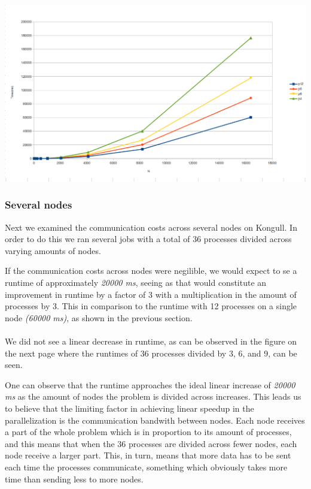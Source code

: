 \documentclass[fontsize=11pt,paper=a4,titlepage]{article}
\begin{document}
\includegraphics[scale=0.5]{pics/pX.png}

\subsubsection{Several nodes}
Next we examined the communication costs across several nodes on Kongull.
In order to do this we ran several jobs with a total of 36 processes divided across varying amounts of nodes.

If the communication costs across nodes were negilible, we would expect to se a runtime of approximately \emph{20000 ms}, seeing as that would constitute an improvement in runtime by a factor of 3 with a multiplication in the amount of processes by 3. This in comparison to the runtime with 12 processes on a single node \emph{(60000 ms)}, as shown in the previous section.
\\\\
We did not see a linear decrease in runtime, as can be observed in the figure on the next page where the runtimes of 36 processes divided by 3, 6, and 9, can be seen.

One can observe that the runtime approaches the ideal linear increase of \emph{20000 ms} as the amount of nodes the problem is divided across increases. This leads us to believe that the limiting factor in achieving linear speedup in the parallelization is the communication bandwith between nodes.
Each node receives a part of the whole problem which is in proportion to its amount of processes, and this means that when the 36 processes are divided across fewer nodes, each node receive a larger part. This, in turn, means that more data has to be sent each time the processes communicate, something which obviously takes more time than sending less to more nodes. 
\end{document}
